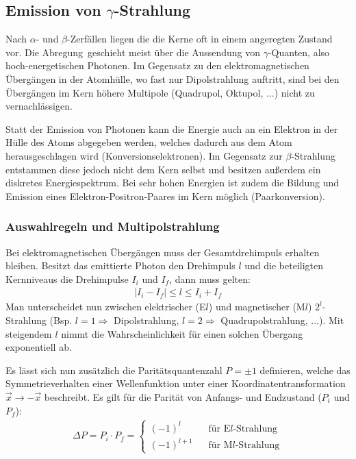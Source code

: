 \subsection{Emission von $\gamma$-Strahlung}

Nach $\alpha$- und $\beta$-Zerfällen liegen die die Kerne oft in einem angeregten Zustand vor. Die \glqq Abregung\grqq\ geschieht meist über die Aussendung von $\gamma$-Quanten, also hoch-energetischen Photonen. Im Gegensatz zu den elektromagnetischen Übergängen in der Atomhülle, wo fast nur Dipolstrahlung auftritt, sind bei den Übergängen im Kern höhere Multipole (Quadrupol, Oktupol, ...) nicht zu vernachlässigen. 

Statt der Emission von Photonen kann die Energie auch an ein Elektron in der Hülle des Atoms abgegeben werden, welches dadurch aus dem Atom herausgeschlagen wird (Konversionselektronen). Im Gegensatz zur $\beta$-Strahlung entstammen diese jedoch nicht dem Kern selbst und besitzen außerdem ein diskretes Energiespektrum. Bei sehr hohen Energien ist zudem die Bildung und Emission eines Elektron-Positron-Paares im Kern möglich (Paarkonversion).

\subsubsection{Auswahlregeln und Multipolstrahlung}

Bei elektromagnetischen Übergängen muss der Gesamtdrehimpuls erhalten bleiben. Besitzt das emittierte Photon den Drehimpuls $l$ und die beteiligten Kernniveaus die Drehimpulse $I_i$ und $I_f$, dann muss gelten:
\begin{align}
	\left| I_i - I_f\right| \leq l \leq I_i + I_f
\end{align}
Man unterscheidet nun zwischen elektrischer (E$l$) und magnetischer (M$l$) $2^l$-Strahlung (Bsp. $l=1\Longrightarrow$ Dipolstrahlung, $l=2\Longrightarrow$ Quadrupolstrahlung, ...). Mit steigendem $l$ nimmt die Wahrscheinlichkeit für einen solchen Übergang exponentiell ab.

Es lässt sich nun zusätzlich die Paritätsquantenzahl $P=\pm 1$ definieren, welche das Symmetrieverhalten einer Wellenfunktion unter einer Koordinatentransformation $\vec{x}\longrightarrow -\vec{x}$ beschreibt. Es gilt für die Parität von Anfangs- und Endzustand ($P_i$ und $P_f$):
\begin{align}
	\Delta P= P_i\cdot P_f = \begin{cases}
	\left( -1\right)^l\,\,\,\,\,&\text{für E$l$-Strahlung} \\
	\left( -1\right)^{l+1}\,\,\,\,\,&\text{für M$l$-Strahlung}
	\end{cases}
\end{align}

